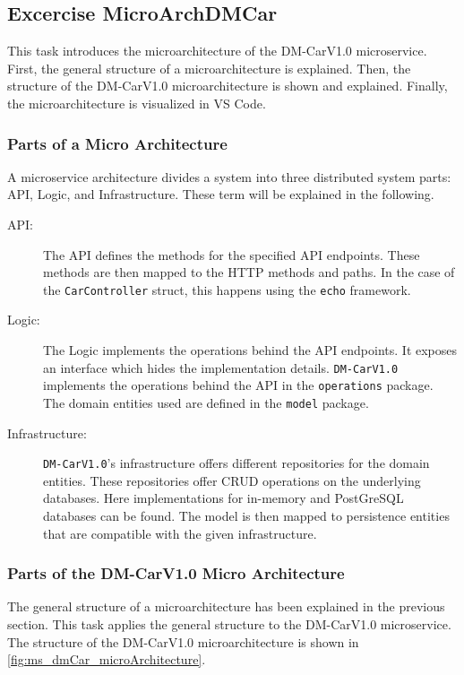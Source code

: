 \subsection{Excercise MicroArchDMCar}
This task introduces the microarchitecture of the DM-CarV1.0 microservice.
First, the general structure of a microarchitecture is explained.
Then, the structure of the DM-CarV1.0 microarchitecture is shown and explained.
Finally, the microarchitecture is visualized in VS Code.

\subsubsection*{Parts of a Micro Architecture}
A microservice architecture divides a system into three distributed system parts: API, Logic, and Infrastructure.
These term will be explained in the following.

\begin{description}
    \item[API:] The API defines the methods for the specified API endpoints. 
                These methods are then mapped to the HTTP methods and paths.
                In the case of the \texttt{CarController} struct, this happens using the \texttt{echo} framework.
    \item[Logic:] The Logic implements the operations behind the API endpoints.
                It exposes an interface which hides the implementation details.
                \texttt{DM-CarV1.0} implements the operations behind the API in the \texttt{operations} package.
                The domain entities used are defined in the \texttt{model} package.
    \item[Infrastructure:] \texttt{DM-CarV1.0}'s infrastructure offers different repositories for the domain entities.
                These repositories offer CRUD operations on the underlying databases.
                Here implementations for in-memory and PostGreSQL databases can be found.
                The model is then mapped to persistence entities that are compatible with the given infrastructure.
\end{description}

\subsubsection*{Parts of the DM-CarV1.0 Micro Architecture}
The general structure of a microarchitecture has been explained in the previous section.
This task applies the general structure to the DM-CarV1.0 microservice.
The structure of the DM-CarV1.0 microarchitecture is shown in \autoref{fig:ms_dmCar_microArchitecture}.

